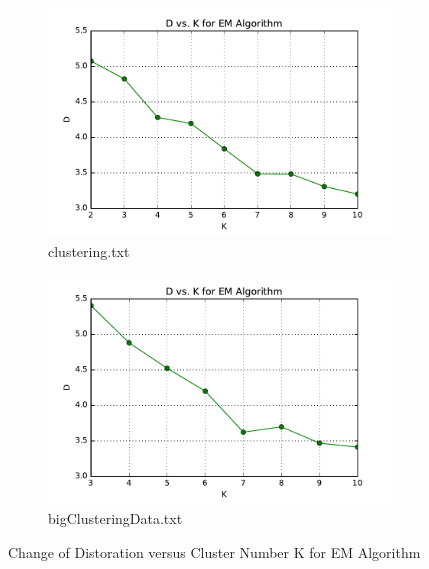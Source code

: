 \begin{description}
\begin{description}
\begin{figure}[H]
\centering
\centering
        \begin{subfigure}[b]{0.49\textwidth}
            \centering
            \includegraphics[width=\textwidth]{./figures/loss_clustering_EM.pdf}
            \caption{clustering.txt}\label{fig:13a}
        \end{subfigure}
        \hfill
        \begin{subfigure}[b]{0.49\textwidth}  
            \centering 
            \includegraphics[width=\textwidth]{./figures/loss_bigClustering_EM.pdf}
            \caption{bigClusteringData.txt}\label{fig:13b}
        \end{subfigure}
\caption{Change of Distoration versus Cluster Number K for EM Algorithm}
\label{fig:EM-loss} 
\end{figure}


\end{description}
\end{description}
